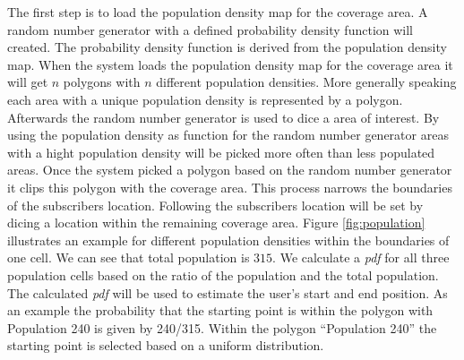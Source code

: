 \documentclass[master,english]{hgbthesis}
\begin{document}
The first step is to load the population density map for the coverage area. A random number generator with a defined probability density function will created. The probability density function is derived from the population density map. When the system loads the population density map for the coverage area it will get $n$ polygons with $n$ different population densities. More generally speaking each area with a unique population density is represented by a polygon. Afterwards the random number generator is used to dice a area of interest. By using the population density as function for the random number generator areas with a hight population density will be picked more often than less populated areas. Once the system picked a polygon based on the random number generator it clips this polygon with the coverage area. This process narrows the boundaries of the subscribers location. Following the subscribers location will be set by dicing a location within the remaining coverage area. Figure \ref{fig:population} illustrates an example for different population densities within the boundaries of one cell. We can see that total population is $315$. We calculate a \emph{pdf} for all three population cells based on the ratio of the population and the total population. The calculated \emph{pdf} will be used to estimate the user's start and end position. As an example the probability that the starting point is within the polygon with Population 240 is given by 240/315. Within the polygon ``Population 240'' the starting point is selected based on a uniform distribution. 
\end{document}
